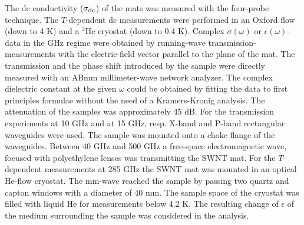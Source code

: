 \begin{multicols}{2}
The dc conductivity ($\sigma_{\rm dc}$) of the mats was measured with the
four-probe technique. The $T$-dependent dc measurements were performed
in an Oxford flow (down to 4 K) and a $^3$He cryostat (down to 0.4
K). Complex $\sigma(\omega)$ or $\epsilon(\omega)$-data in the GHz
regime were obtained by running-wave transmission-measurements with the
electric-field vector parallel to the plane of the mat. The transmission and
the phase shift introduced by the sample were directly measured with an ABmm
millimeter-wave network analyzer. The complex dielectric constant at the
given $\omega$ could be obtained by fitting the data to first principles
formulae\cite{Reedijk99} without the need of a Kramers-Kronig analysis. The
attenuation of the samples was approximately 45 dB. For the transmission
experiments at 10 GHz and at 15 GHz, resp. X-band and P-band rectangular
waveguides were used. The sample was mounted onto a choke flange of the
waveguides. Between 40 GHz and 500 GHz a free-space electromagnetic wave,
focused with polyethylene lenses was transmitting the SWNT mat. For the
$T$-dependent measurements at 285 GHz the SWNT mat was mounted in an optical
He-flow cryostat. The mm-wave reached the sample by passing two quartz and
capton windows with a diameter of
40 mm. The sample space of the cryostat was filled with liquid He
for measurements below 4.2 K. The resulting change of $\epsilon$ of the
medium surrounding the sample was considered in the analysis.\\


\end{multicols}
